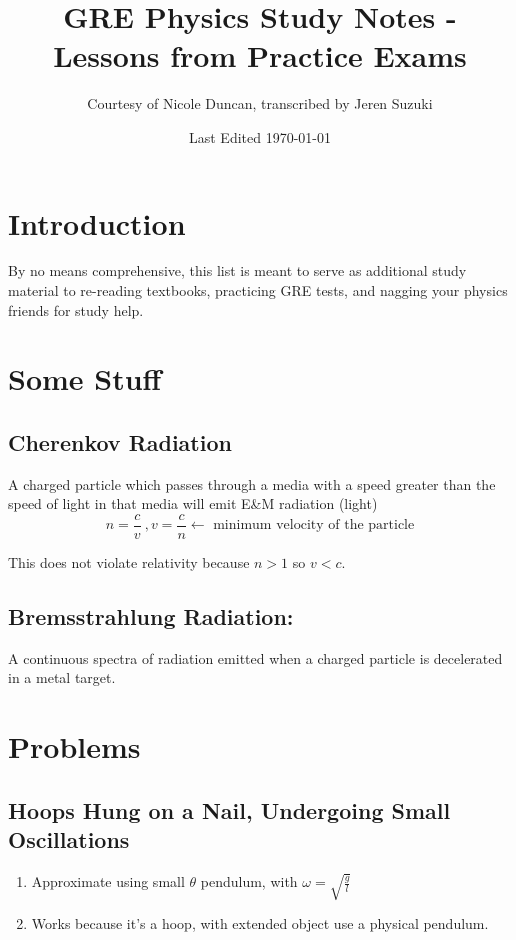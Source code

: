 \documentclass[10pt,a4paper]{article}
\title{GRE Physics Study Notes - Lessons from Practice Exams}
\author{Courtesy of Nicole Duncan, transcribed by Jeren Suzuki}
\date{Last Edited \today}
\begin{document}
\maketitle
{}
\newpage
\tableofcontents
\newpage
{}


\section*{Introduction}
By no means comprehensive, this list is meant to serve as additional study material to re-reading textbooks, practicing GRE tests, and nagging your physics friends for study help.


\section{Some Stuff}
\subsection{Cherenkov Radiation}
A charged particle which passes through a media with a speed greater than the speed of light in that media will emit E\&M radiation (light)
\begin{equation}
 n = \frac{c}{v}~, v= \frac{c}{n} \leftarrow \textrm{ minimum velocity of the particle}
\end{equation}

This does not violate relativity because $n>1$ so $v<c$.

\subsection{Bremsstrahlung Radiation:}
A continuous spectra of radiation emitted when a charged particle is decelerated in a metal target.

\section{Problems}
\subsection{Hoops Hung on a Nail, Undergoing Small Oscillations}
\begin{enumerate}
    \item Approximate using small $\theta$ pendulum, with $\omega = \sqrt{\frac{g}{l}}$
    \item Works because it's a hoop, with extended object use a physical pendulum.
\end{enumerate}
\end{document}
